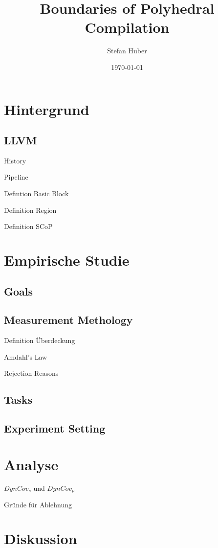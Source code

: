 \documentclass[xcolor=dvipsnames]{beamer}
\title[Eine empirische Studie]{Boundaries of Polyhedral Compilation}
\author{Stefan Huber}
\institute{
    Fakultät für Informatik und Mathematik\\
    Universität Passau
}
\date{\today}
\begin{document}
\frame{\titlepage}

\section{Hintergrund}
\subsection{LLVM}
\begin{frame}{History}
\end{frame}
\begin{frame}{Pipeline}
\end{frame}
\begin{frame}{Defintion Basic Block}
\end{frame}
\begin{frame}{Definition Region}
\end{frame}
\begin{frame}{Definition SCoP}
\end{frame}

\section{Empirische Studie}
\subsection{Goals}
\subsection{Measurement Methology}
\begin{frame}{Definition Überdeckung}
\end{frame}
\begin{frame}{Amdahl's Law}
\end{frame}
\begin{frame}{Rejection Reasons}
\end{frame}
\subsection{Tasks}
\subsection{Experiment Setting}

\section{Analyse}
\begin{frame}{\(DynCov_s\) und \(DynCov_p\)}
    \begin{figure}[!h]
        
    \end{figure}
\end{frame}
\begin{frame}{Gründe für Ablehnung}
    \begin{figure}[!h]
        
     \end{figure}
\end{frame}

\section{Diskussion}
\end{document}
